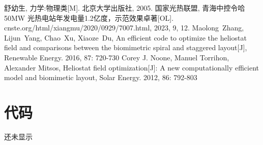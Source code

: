 \newpage

\begin{thebibliography}{9}
舒幼生, 力学:物理类[M]. 北京大学出版社, 2005.
国家光热联盟, 青海中控令哈 50MW 光热电站年发电量1.2亿度，示范效果卓著[OL]. cnste.org/html/xiangmu/2020/0929/7007.html, 2023, 9, 12.
Maolong~Zhang, Lijun~Yang, Chao~Xu, Xiaoze~Du, An efficient code to optimize the heliostat field and comparisons between the biomimetric spiral and staggered layout[J], Renewable Energy. 2016, 87: 720-730
Corey J. Noone, Manuel Torrihon, Alexander Mitsos, Heliostat field optimization[J]: A new computationally efficient model and biomimetic layout, Solar Energy. 2012, 86: 792-803
\end{thebibliography}

\appendix
\section{代码}
还未显示
